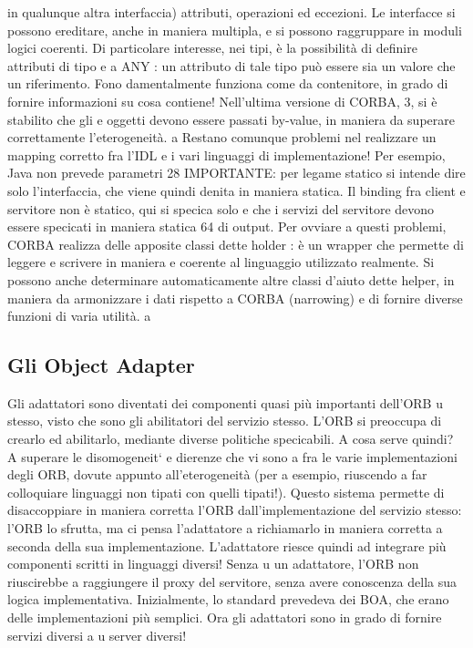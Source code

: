 \documentclass[a4paper,12pt]{article}
\begin{document}
in qualunque altra interfaccia) attributi, operazioni ed eccezioni. Le interfacce
si possono ereditare, anche in maniera multipla, e si possono raggruppare in
moduli logici coerenti.
Di particolare interesse, nei tipi, è la possibilità di definire attributi di tipo
e
a
ANY : un attributo di tale tipo può essere sia un valore che un riferimento. Fono
damentalmente funziona come da contenitore, in grado di fornire informazioni
su cosa contiene! Nell'ultima versione di CORBA, 3, si è stabilito che gli
e
oggetti devono essere passati by-value, in maniera da superare correttamente
l'eterogeneità.
a
Restano comunque problemi nel realizzare un mapping corretto fra l'IDL e
i vari linguaggi di implementazione! Per esempio, Java non prevede parametri
28 IMPORTANTE: per legame statico si intende dire solo l'interfaccia, che viene quindi
denita in maniera statica. Il binding fra client e servitore non è statico, qui si specica solo
e
che i servizi del servitore devono essere specicati in maniera statica
64
di output. Per ovviare a questi problemi, CORBA realizza delle apposite classi dette holder : è un wrapper che permette
di leggere e scrivere in maniera
e
coerente al linguaggio utilizzato realmente. Si possono anche determinare automaticamente altre classi d'aiuto dette
helper, in maniera da armonizzare i dati
rispetto a CORBA (narrowing) e di fornire diverse funzioni di varia utilità.
a
\subsection{Gli Object Adapter}
Gli adattatori sono diventati dei componenti quasi più importanti dell'ORB
u
stesso, visto che sono gli abilitatori del servizio stesso. L'ORB si preoccupa di
crearlo ed abilitarlo, mediante diverse politiche specicabili.
A cosa serve quindi? A superare le disomogeneit` e dierenze che vi sono
a
fra le varie implementazioni degli ORB, dovute appunto all'eterogeneità (per
a
esempio, riuscendo a far colloquiare linguaggi non tipati con quelli tipati!).
Questo sistema permette di disaccoppiare in maniera corretta l'ORB dall'implementazione del servizio stesso: l'ORB lo
sfrutta, ma ci pensa l'adattatore a
richiamarlo in maniera corretta a seconda della sua implementazione. L'adattatore riesce quindi ad integrare più
componenti scritti in linguaggi diversi! Senza
u
un adattatore, l'ORB non riuscirebbe a raggiungere il proxy del servitore, senza
avere conoscenza della sua logica implementativa.
Inizialmente, lo standard prevedeva dei BOA, che erano delle implementazioni più semplici. Ora gli adattatori sono in
grado di fornire servizi diversi a
u
server diversi!
\end{document}
